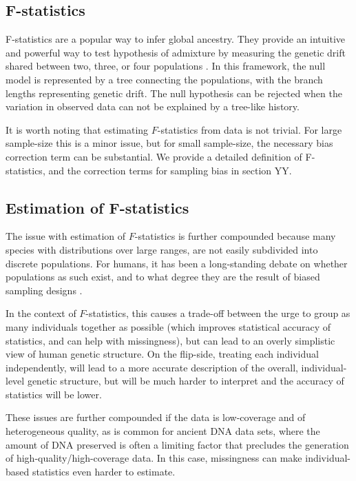 \documentclass[12pt, letterpaper]{article}
\begin{document}
\subsection{F-statistics}
F-statistics are a popular way to infer global ancestry. They provide an intuitive and powerful way to test hypothesis of admixture by measuring the genetic drift shared between two, three, or four populations \cite{patterson_ancient_2012, peter_admixture_2016}. In this framework, the null model is represented by a tree connecting the populations, with the branch lengths representing genetic drift. The null hypothesis can be rejected when the variation in observed data can not be explained by a tree-like history. 

It is worth noting that estimating $F$-statistics from data is not trivial. For large sample-size this is a minor issue, but for small sample-size, the necessary bias correction term can be substantial\cite{patterson_ancient_2012}. We provide a detailed definition of F-statistics, and the correction terms for sampling bias in section YY.

\subsection{Estimation of F-statistics}
The issue with estimation of $F$-statistics is further compounded because many species with distributions over large ranges, are not easily subdivided into discrete populations. For humans, it has been a long-standing debate on whether populations as such exist, and to what degree they are the result of biased sampling designs \cite{serre_evidence_2004, rosenberg_clines_2005, peter_genetic_2020}. 

In the context of $F$-statistics, this causes a trade-off between the urge to group as many individuals together as possible (which improves statistical accuracy of statistics, and can help with missingness), but can lead to an overly simplistic view of human genetic structure. On the flip-side, treating each individual independently, will lead to a more accurate description of the overall, individual-level genetic structure, but will be much harder to interpret and the accuracy of statistics will be lower.


These issues are further compounded if the data is low-coverage and of heterogeneous quality, as is common for ancient DNA data sets, where the amount of DNA preserved is often a limiting factor that precludes the generation of high-quality/high-coverage data. In this case, missingness can make individual-based statistics even harder to estimate.
\end{document}
